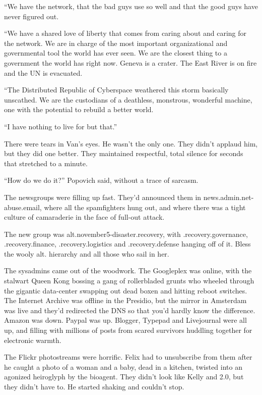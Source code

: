 “We have the network, that the bad guys use so well and that the
good guys have never figured out.

“We have a shared love of liberty that comes from caring about and
caring for the network. We are in charge of the most important
organizational and governmental tool the world has ever seen. We
are the closest thing to a government the world has right now.
Geneva is a crater. The East River is on fire and the UN is
evacuated.

“The Distributed Republic of Cyberspace weathered this storm
basically unscathed. We are the custodians of a deathless,
monstrous, wonderful machine, one with the potential to rebuild a
better world.

“I have nothing to live for but that.”

There were tears in Van’s eyes. He wasn’t the only one. They didn’t
applaud him, but they did one better. They maintained respectful,
total silence for seconds that stretched to a minute.

“How do we do it?” Popovich said, without a trace of sarcasm.

\tb

The newsgroups were filling up fast. They’d announced them in
news.admin.net-abuse.email, where all the spamfighters hung out,
and where there was a tight culture of camaraderie in the face of
full-out attack.

The new group was alt.november5-disaster.recovery, with
.recovery.governance, .recovery.finance, .recovery.logistics and
.recovery.defense hanging off of it. Bless the wooly alt. hierarchy
and all those who sail in her.

The sysadmins came out of the woodwork. The Googleplex was online,
with the stalwart Queen Kong bossing a gang of rollerbladed grunts
who wheeled through the gigantic data-center swapping out dead
boxen and hitting reboot switches. The Internet Archive was offline
in the Presidio, but the mirror in Amsterdam was live and they’d
redirected the DNS so that you’d hardly know the difference. Amazon
was down. Paypal was up. Blogger, Typepad and Livejournal were all
up, and filling with millions of posts from scared survivors
huddling together for electronic warmth.

The Flickr photostreams were horrific. Felix had to unsubscribe
from them after he caught a photo of a woman and a baby, dead in a
kitchen, twisted into an agonized heiroglyph by the bioagent. They
didn’t look like Kelly and 2.0, but they didn’t have to. He started
shaking and couldn’t stop.

